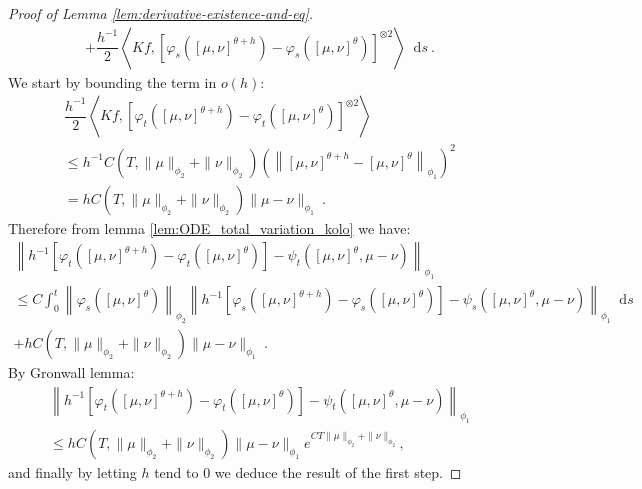 \documentclass[11pt,a4paper]{article}
\newcommand{\brac}[1]{\left\langle#1\right\rangle}
\newcommand{\dd}{\mathop{}\!\mathrm{d}}
\begin{document}
\begin{proof}[Proof of Lemma \ref{lem:derivative-existence-and-eq}]
\begin{multline*}
        + \dfrac{h^{-1}}{2}\brac{Kf, \left[\varphi_s\left(\left[\mu,\nu \right]^{\theta+h} \right) - \varphi_s\left(\left[\mu,\nu \right]^{\theta} \right)\right]^{\otimes 2}} \dd s\ .
    \end{multline*}
    We start by bounding the term in $o(h)$:
    \begin{multline*}
        \dfrac{h^{-1}}{2}\brac{Kf, \left[\varphi_t\left(\left[\mu,\nu \right]^{\theta+h} \right) - \varphi_t\left(\left[\mu,\nu \right]^{\theta} \right)\right]^{\otimes 2}} \\
        \leq h^{-1}C\left(T,\|\mu\|_{\phi_2} + \|\nu\|_{\phi_2}\right)\left(\left\| \left[\mu,\nu \right]^{\theta+h} - \left[\mu,\nu \right]^{\theta}\right\|_{\phi_1}\right)^2\\
        = hC\left(T,\|\mu\|_{\phi_2} + \|\nu\|_{\phi_2}\right)\|\mu - \nu\|_{\phi_1}\ .
    \end{multline*}
    Therefore from lemma \ref{lem:ODE_total_variation_kolo} we have:
    \begin{multline*}
        \left\| h^{-1}\left[\varphi_t\left(\left[\mu,\nu \right]^{\theta+h} \right) - \varphi_t\left(\left[\mu,\nu \right]^{\theta} \right) \right] - \psi_t\left(\left[\mu,\nu \right]^\theta,\mu-\nu\right)\right\|_{\phi_1} \\
        \leq C\int_0^t \left\| \varphi_s\left(\left[\mu,\nu \right]^{\theta} \right) \right\|_{\phi_2}\left\| h^{-1}\left[\varphi_s\left(\left[\mu,\nu \right]^{\theta+h} \right) - \varphi_s\left(\left[\mu,\nu \right]^{\theta} \right) \right] - \psi_s\left(\left[\mu,\nu \right]^\theta,\mu-\nu\right)\right\|_{\phi_1} \dd s\\
        + hC\left(T,\|\mu\|_{\phi_2} + \|\nu\|_{\phi_2}\right)\|\mu - \nu\|_{\phi_1}\ .
    \end{multline*}
    By Gronwall lemma:
    \begin{multline*}
        \left\| h^{-1}\left[\varphi_t\left(\left[\mu,\nu \right]^{\theta+h} \right) - \varphi_t\left(\left[\mu,\nu \right]^{\theta} \right) \right] - \psi_t\left(\left[\mu,\nu \right]^\theta,\mu-\nu\right)\right\|_{\phi_1} \\
        \leq hC\left(T,\|\mu\|_{\phi_2} + \|\nu\|_{\phi_2}\right)\|\mu - \nu\|_{\phi_1} e^{CT\|\mu\|_{\phi_2} + \|\nu\|_{\phi_2}},
    \end{multline*}
    and finally by letting $h$ tend to $0$ we deduce the result of the first step.
    

\end{proof}
\end{document}
